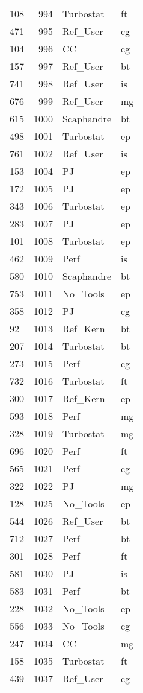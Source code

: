 \begin{tabular}{lrll}
108 & 994 & Turbostat & ft \\
471 & 995 & Ref_User & cg \\
104 & 996 & CC & cg \\
157 & 997 & Ref_User & bt \\
741 & 998 & Ref_User & is \\
676 & 999 & Ref_User & mg \\
615 & 1000 & Scaphandre & bt \\
498 & 1001 & Turbostat & ep \\
761 & 1002 & Ref_User & is \\
153 & 1004 & PJ & ep \\
172 & 1005 & PJ & ep \\
343 & 1006 & Turbostat & ep \\
283 & 1007 & PJ & ep \\
101 & 1008 & Turbostat & ep \\
462 & 1009 & Perf & is \\
580 & 1010 & Scaphandre & bt \\
753 & 1011 & No_Tools & ep \\
358 & 1012 & PJ & cg \\
92 & 1013 & Ref_Kern & bt \\
207 & 1014 & Turbostat & bt \\
273 & 1015 & Perf & cg \\
732 & 1016 & Turbostat & ft \\
300 & 1017 & Ref_Kern & ep \\
593 & 1018 & Perf & mg \\
328 & 1019 & Turbostat & mg \\
696 & 1020 & Perf & ft \\
565 & 1021 & Perf & cg \\
322 & 1022 & PJ & mg \\
128 & 1025 & No_Tools & ep \\
544 & 1026 & Ref_User & bt \\
712 & 1027 & Perf & bt \\
301 & 1028 & Perf & ft \\
581 & 1030 & PJ & is \\
583 & 1031 & Perf & bt \\
228 & 1032 & No_Tools & ep \\
556 & 1033 & No_Tools & cg \\
247 & 1034 & CC & mg \\
158 & 1035 & Turbostat & ft \\
439 & 1037 & Ref_User & cg \\

\end{tabular}
